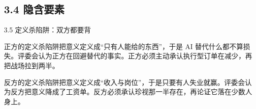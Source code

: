 \documentclass[prep,both]{debate}
\begin{document}
\subsection{3.4 隐含要素}
\begin{fields}
\end{fields}

\begin{warnbox}{3.5 定义杀陷阱：双方都要背}
\begin{fields}
\begin{procard}{正方的定义杀陷阱}把意义定义成“只有人能给的东西”，于是 AI 替代什么都不算损失。评委会认为正方在回避替代的事实。正方必须主动承认执行型订单在减少，再把战场拉到两半。\end{procard}
\begin{concard}{反方的定义杀陷阱}把意义定义成“收入与岗位”，于是只要有人失业就赢。评委会认为反方把意义降成了工资单。反方必须承认珍视那一半存在，再论证它落在少数人身上。\end{concard}
\end{fields}
\end{warnbox}
\end{document}
